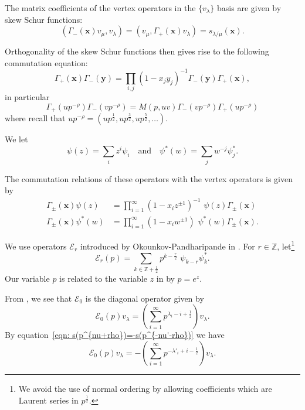 \documentclass[12pt]{amsart}
\newcommand{\znums} {{\mathbb Z}}		%
\newcommand{\half}{\frac{1}{2}}
\theoremstyle{definition}
\newcommand{\ZplusHalf}{\znums+{ \half}}
\newcommand{\E}{\mathcal{E}}
\newcommand{\ptotheminusrho}{p^{-\rho}}
\begin{document}
The matrix coefficients of the vertex operators in the $\{v_{\lambda}
\}$ basis are given by skew Schur functions:
\begin{equation}\label{eqn: matrix coefs of vertex ops are skew schur}
(\Gamma_{-}(\mathbf{x})v_{\mu},v_{\lambda}) =
(v_{\mu},\Gamma_{+}(\mathbf{x})v_{\lambda}) = s_{\lambda
/\mu}(\mathbf{x}).
\end{equation}

Orthogonality of the skew Schur functions then gives rise to the
following commutation equation:
\[
\Gamma_{+}(\mathbf{x})\Gamma_{-}(\mathbf{y}) = \prod_{i,j}
(1-x_{j}y_{j})^{-1} \Gamma_{-}(\mathbf{y})\Gamma_{+}(\mathbf{x}),
\]
in particular
\begin{equation}\label{eqn: Gamma+Gamma- commutation relation}
\Gamma_{+}(u\ptotheminusrho )\Gamma_{-}(v\ptotheminusrho ) =M(p,uv)
\Gamma_{-}(v\ptotheminusrho )\Gamma_{+}(u\ptotheminusrho )
\end{equation}
where recall that $u\ptotheminusrho  = (up^{\frac{1}{2}},up^{\frac{3}{2}},up^{\frac{5}{2}},\dots )$.

We let
\[
\psi (z) = \sum_{i} z^{i}\psi_{i}\quad \text{and}\quad \psi^{*}(w) =
\sum_{j} w^{-j} \psi_{j}^{*}. 
\]

The commutation relations of these operators with the vertex operators
is given by
\begin{align}\label{eqn: commutation of Gamma(x) with psi(z) and psi*(w)}
\Gamma_{\pm}(\mathbf{x})\psi (z) &= \prod_{i=1}^{\infty}
(1-x_{i}z^{\pm 1})^{-1} \,\, \psi (z)\Gamma_{\pm}(\mathbf{x})\\
\Gamma_{\pm}(\mathbf{x})\psi^{*} (w) &= \prod_{i=1}^{\infty}
(1-x_{i}w^{\pm 1}) \,\,\psi^{*}(w)\Gamma_{\pm}(\mathbf{x}).\nonumber
\end{align}


We use operators $\E_{r}$ introduced by Okounkov-Pandharipande in
\cite[\S~2.2.4]{Okounkov-Pandharipande-completed-cycles}.  For $r\in
\znums$, let\footnote{We avoid the use of normal ordering by allowing
coefficients which are Laurent series in $p^{\half}$.}
\[
\E_{r}(p) = \sum_{k\in \ZplusHalf} p^{k-\frac{r}{2}}\,\, \psi_{k-r}\psi^{*}_{k}.
\]
Our variable $p$ is related to the variable $z$ in
\cite{Okounkov-Pandharipande-completed-cycles} by $p=e^{z}.$


From \cite[Eqns~2.9 and 0.18]{Okounkov-Pandharipande-completed-cycles}, we
see that $\E_{0}$ is the diagonal operator given by
\[
\E _0 (p) v_{\lambda} = \left(\sum_{i=1}^{\infty}
p^{\lambda_{i}-i+\half} \right)v_{\lambda}. 
\]
By equation~\eqref{eqn: s(p^{nu+rho})=-s(p^{-nu'-rho})} we have
\begin{equation}\label{eqn: formula for the operator E0}
\E _0 (p) v_{\lambda} = -\left(\sum_{i=1}^{\infty}
p^{-\lambda'_{i}+i-\half} \right)v_{\lambda}. 
\end{equation}
\end{document}
